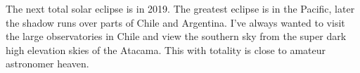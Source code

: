 The next total solar eclipse is in 2019. The greatest eclipse is in the
Pacific, later the shadow runs over parts of Chile and Argentina. I've
always wanted to visit the large observatories in Chile and view the
southern sky from the super dark high elevation skies of the Atacama.
This with totality is close to amateur astronomer heaven.



%
 
 
 
